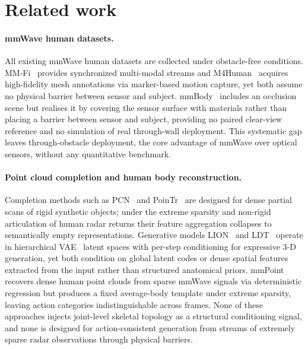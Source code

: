 \documentclass{article}
\begin{document}
\section{Related work}
\label{sec:related}

\paragraph{mmWave human datasets.}
All existing mmWave human datasets are collected under obstacle-free
conditions.
MM-Fi~\cite{yang2023mmfi} provides synchronized multi-modal streams and
M4Human~\cite{m4human} acquires high-fidelity mesh annotations via
marker-based motion capture, yet both assume no physical barrier between
sensor and subject.
mmBody~\cite{mmbody} includes an occlusion scene but realises it by
covering the sensor surface with materials rather than placing a barrier
between sensor and subject, providing no paired clear-view reference and
no simulation of real through-wall deployment.
This systematic gap leaves through-obstacle deployment, the core advantage
of mmWave over optical sensors, without any quantitative benchmark.

\paragraph{Point cloud completion and human body reconstruction.}
Completion methods such as PCN~\cite{pcn} and PoinTr~\cite{pointr} are
designed for dense partial scans of rigid synthetic objects; under the
extreme sparsity and non-rigid articulation of human radar returns their
feature aggregation collapses to semantically empty representations.
Generative models LION~\cite{lion} and LDT~\cite{ldt} operate in
hierarchical VAE~\cite{vae} latent spaces with per-step conditioning for
expressive 3-D generation, yet both condition on global latent codes or
dense spatial features extracted from the input rather than structured
anatomical priors.
mmPoint~\cite{mmpoint} recovers dense human point clouds from sparse
mmWave signals via deterministic regression but produces a fixed
average-body template under extreme sparsity, leaving action categories
indistinguishable across frames.
None of these approaches injects joint-level skeletal topology as a
structural conditioning signal, and none is designed for action-consistent
generation from streams of extremely sparse radar observations through
physical barriers.
\end{document}
